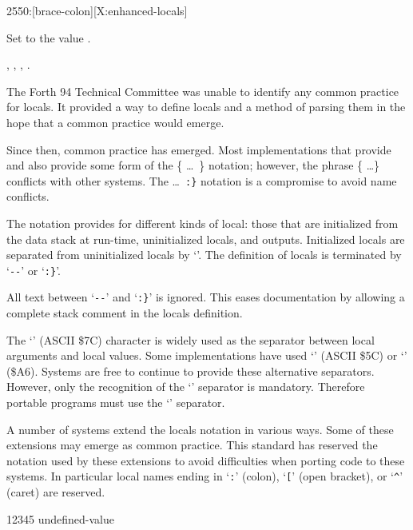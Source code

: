 \begin{worddef}[b:]{2550}{\brace:}[brace-colon][X:enhanced-locals]

	Set  to the value .

\see {},
	,
	,
	.

	\begin{rationale}
		The Forth 94 Technical Committee was unable to identify any
		common practice for locals.  It provided a way to define locals
		and a method of parsing them in the hope that a common practice
		would emerge.

		Since then, common practice has emerged.  Most implementations that
		provide  and \linebreak[1]  also provide some form of the
		\{ \ldots\ \} notation; however, the phrase \{ \ldots \} conflicts with
		other systems.  The  \ldots\ \texttt{:\}} notation is a compromise
		to avoid name conflicts.

		The notation provides for different kinds of local: those that are
		initialized from the data stack at run-time, uninitialized locals, and
		outputs.  Initialized locals are separated from uninitialized locals by
		`\texttt{\textbar}'.  The definition of locals is terminated by
		`\texttt{-{}-}' or `\texttt{:\}}'.

		All text between `\texttt{-{}-}' and `\texttt{:\}}' is ignored.  This eases
		documentation by allowing a complete stack comment in the locals definition.

		The `\texttt{\textbar}' (ASCII \$7C) character is widely used as the
		separator between local arguments and local values.  Some implementations
		have used `\texttt{\bs}' (ASCII \$5C) or `\texttt{\textbrokenbar}' (\$A6).
		Systems are free to continue to provide these alternative separators.
		However, only the recognition of the `\texttt{\textbar}' separator is
		mandatory. Therefore portable programs must use the `\texttt{\textbar}'
		separator.

		A number of systems extend the locals notation in various ways.  Some of
		these extensions may emerge as common practice.  This standard has reserved
		the notation used by these extensions to avoid difficulties when porting
		code to these systems.  In particular local names ending in
		`\texttt{:}' (colon),
		`\texttt{[}' (open bracket), or
		`\texttt{\textasciicircum}' (caret) are reserved.
	\end{rationale}

	\begin{implement}
12345  undefined-value


\end{implement}
\end{worddef}
